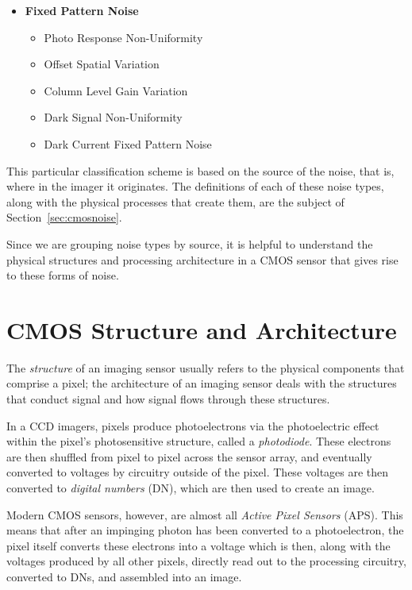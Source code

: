 \documentclass[10pt]{article}
\begin{document}
\begin{itemize}[noitemsep]
      \begin{itemize}[noitemsep]
         \item \textbf{Fixed Pattern Noise}
         \begin{itemize}[noitemsep]
                \item Photo Response Non-Uniformity
                \item Offset Spatial Variation
                \item Column Level Gain Variation
                \item Dark Signal Non-Uniformity
                \item Dark Current Fixed Pattern Noise
             \end{itemize}
      \end{itemize}
\end{itemize}

This particular classification scheme is based on the source of the noise, that is, where in the imager it originates. The definitions of each of these noise types, along with the physical processes that create them, are the subject of Section~\ref{sec:cmosnoise}. 

Since we are grouping noise types by source, it is helpful to understand the physical structures and processing architecture in a CMOS sensor that gives rise to these forms of noise. 

\section{CMOS Structure and Architecture}

The \emph{structure} of an imaging sensor usually refers to the physical components that comprise a pixel; the architecture of an imaging sensor deals with the structures that conduct signal and how signal flows through these structures. 

In a CCD imagers, pixels produce photoelectrons via the photoelectric effect within the pixel's photosensitive structure, called a \emph{photodiode}. These electrons are then shuffled from pixel to pixel across the sensor array, and eventually converted to voltages by circuitry outside of the pixel. These voltages are then converted to \emph{digital numbers} (DN), which are then used to create an image.

Modern CMOS sensors, however, are almost all \emph{Active Pixel Sensors} (APS). This means that after an impinging photon has been converted to a photoelectron, the pixel itself converts these electrons into a voltage which is then, along with the voltages produced by all other pixels, directly read out to the processing circuitry, converted to DNs, and assembled into an image.
\end{document}
